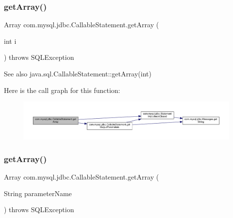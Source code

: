 \mbox{\label{classcom_1_1mysql_1_1jdbc_1_1_callable_statement_a4bbc35f2d808dc379938d9cd02a37ba4}} 
\subsubsection{\texorpdfstring{get\+Array()}{getArray()}\hspace{0.1cm}{\footnotesize\ttfamily [1/2]}}
{\footnotesize\ttfamily Array com.\+mysql.\+jdbc.\+Callable\+Statement.\+get\+Array (\begin{DoxyParamCaption}\item[{int}]{i }\end{DoxyParamCaption}) throws S\+Q\+L\+Exception}

\begin{DoxySeeAlso}{See also}
java.\+sql.\+Callable\+Statement\+::get\+Array(int) 
\end{DoxySeeAlso}
Here is the call graph for this function\+:\nopagebreak
\begin{figure}[H]
\begin{center}
\leavevmode
\includegraphics[width=350pt]{classcom_1_1mysql_1_1jdbc_1_1_callable_statement_a4bbc35f2d808dc379938d9cd02a37ba4_cgraph}
\end{center}
\end{figure}
\mbox{\label{classcom_1_1mysql_1_1jdbc_1_1_callable_statement_a6bc325b24afe0481026e3acedf399d1b}} 
\subsubsection{\texorpdfstring{get\+Array()}{getArray()}\hspace{0.1cm}{\footnotesize\ttfamily [2/2]}}
{\footnotesize\ttfamily Array com.\+mysql.\+jdbc.\+Callable\+Statement.\+get\+Array (\begin{DoxyParamCaption}\item[{String}]{parameter\+Name }\end{DoxyParamCaption}) throws S\+Q\+L\+Exception}

